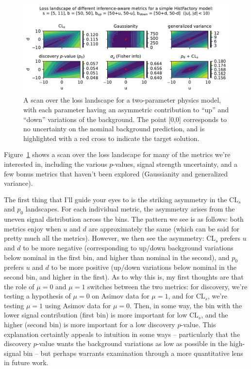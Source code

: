 \documentclass[
  11pt,
  numbers=noendperiod]{book}
\begin{document}
\begin{figure}

{\centering \includegraphics{./images/metrics-title.pdf}

}

\caption{\label{fig-whichloss}A scan over the loss landscape for a
two-parameter physics model, with each parameter having an asymmetric
contribution to ``up'' and ``down'' variations of the background. The
point {[}0,0{]} corresponds to no uncertainty on the nominal background
prediction, and is highlighted with a red cross to indicate the target
solution.}

\end{figure}

Figure~\ref{fig-whichloss} shows a scan over the loss landscape for many
of the metrics we're interested in, including the various \(p\)-values,
signal strength uncertainty, and a few bonus metrics that haven't been
explored (Gaussianity and generalized variance).

The first thing that I'll guide your eyes to is the striking asymmetry
in the \(\mathrm{CL}_s\) and \(p_0\) landscapes. For each individual
metric, the asymmetry arises from the uneven signal distribution across
the bins. The pattern we see is as follows: both metrics enjoy when
\(u\) and \(d\) are approximately the same (which can be said for pretty
much all the metrics). However, we then see the asymmetry:
\(\mathrm{CL}_s\) prefers \(u\) and \(d\) to be more negative
(corresponding to up/down background variations below nominal in the
first bin, and higher than nominal in the second), and \(p_0\) prefers
\(u\) and \(d\) to be more positive (up/down variations below nominal in
the second bin, and higher in the first). As to why this is, my first
thoughts are that the role of \(\mu=0\) and \(\mu=1\) switches between
the two metrics: for discovery, we're testing a hypothesis of \(\mu=0\)
on Asimov data for \(\mu=1\), and for \(\mathrm{CL}_s\), we're testing
\(\mu=1\) using Asimov data for \(\mu=0\). Then, in some way, the bin
with the lower signal contribution (first bin) is more important for low
\(\mathrm{CL}_s\), and the higher (second bin) is more important for a
low discovery \(p\)-value. This explanation certaintly appeals to
intuition in some ways -- particularly that the discovery \(p\)-value
wants the background variations as low as possible in the high-signal
bin -- but perhaps warrants examination through a more quantitative lens
in future work.
\end{document}
